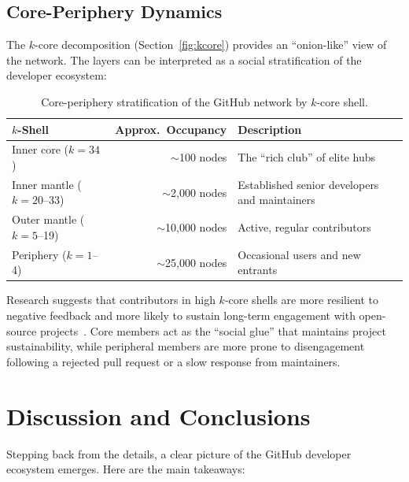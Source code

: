 \documentclass[letterpaper]{article}
\begin{document}
\subsection{Core-Periphery Dynamics}

The $k$-core decomposition (Section~\ref{fig:kcore}) provides an ``onion-like'' view of the network. The layers can be interpreted as a social stratification of the developer ecosystem:

\begin{table}[H]
  \centering
  \begin{tabular}{lrl}
    \toprule
    \textbf{$k$-Shell} & \textbf{Approx.\ Occupancy} & \textbf{Description} \\
    \midrule
    Inner core ($k = 34$)     & $\sim$100 nodes    & The ``rich club'' of elite hubs \\
    Inner mantle ($k = 20$--33)  & $\sim$2,000 nodes  & Established senior developers and maintainers \\
    Outer mantle ($k = 5$--19)   & $\sim$10,000 nodes & Active, regular contributors \\
    Periphery ($k = 1$--4)       & $\sim$25,000 nodes & Occasional users and new entrants \\
    \bottomrule
  \end{tabular}
  \caption{Core-periphery stratification of the GitHub network by $k$-core shell.}
  \label{tab:core_periphery}
\end{table}

Research suggests that contributors in high $k$-core shells are more resilient to negative feedback and more likely to sustain long-term engagement with open-source projects~\cite{wang2024impact}. Core members act as the ``social glue'' that maintains project sustainability, while peripheral members are more prone to disengagement following a rejected pull request or a slow response from maintainers.

\section{Discussion and Conclusions}

Stepping back from the details, a clear picture of the GitHub developer ecosystem emerges. Here are the main takeaways:
\end{document}
